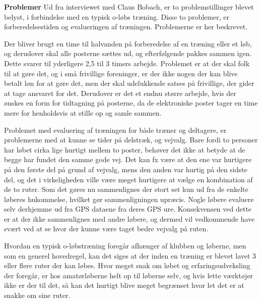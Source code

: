 \textbf{Problemer}\newline
Ud fra interviewet med Claus Bobach, er to problemstillinger blevet belyst, i forbindelse med en typisk o-løbs træning. Disse to problemer, er forberedelsestiden og evalueringen af træningen. Problemerne er her beskrevet.

Der bliver brugt en time til halvanden på forberedelse af en træning eller et løb, og derudover skal alle posterne sættes ud, og efterfølgende pakkes sammen igen. Dette svarer til yderligere 2,5 til 3 timers arbejde. \newline
Problemet er at der skal folk til at gøre det, og i små frivillige foreninger, er der ikke nogen der kan blive betalt løn for at gøre det, men der skal udelukkende satses på frivillige, der gider at tage ansvaret for det. \newline
Derudover er det et endnu større arbejde, hvis der ønskes en form for tidtagning på posterne, da de elektroniske poster tager en time mere for henholdsvis at stille op og samle sammen. 

Problemet med evaluering af træningen for både træner og deltagere, er problemerne med at kunne se tider på delstræk, og vejvalg. Bare fordi to personer har løbet cirka lige hurtigt mellem to poster, behøver det ikke at betyde at de begge har fundet den samme gode vej. Det kan fx være at den ene var hurtigere på den første del på grund af vejvalg, mens den anden var hurtig på den sidste del, og det i virkeligheden ville være meget hurtigere at vælge en kombination af de to ruter. Som det gøres nu sammenlignes der stort set kun ud fra de enkelte løberes hukommelse, hvilket gør sammenligningen upræcis. Nogle løbere evaluere selv derhjemme ud fra GPS dataene fra deres GPS ure. Konsekvensen ved dette er at der ikke sammenlignes med andre løbere, og dermed vil vedkommende have svært ved at se hvor der kunne være taget bedre vejvalg på ruten.

Hvordan en typisk o-løbstræning foregår afhænger af klubben og løberne, men som en generel hovedregel, kan det siges at der inden en træning er blevet lavet 3 eller flere ruter der kan løbes. Hvor meget snak om løbet og erfaringsudveksling der foregår, er hos amatørløberne helt op til løberne selv, og hvis lette værktøjer ikke er der til det, så kan det hurtigt blive meget begrænset hvor let det er at snakke om sine ruter.